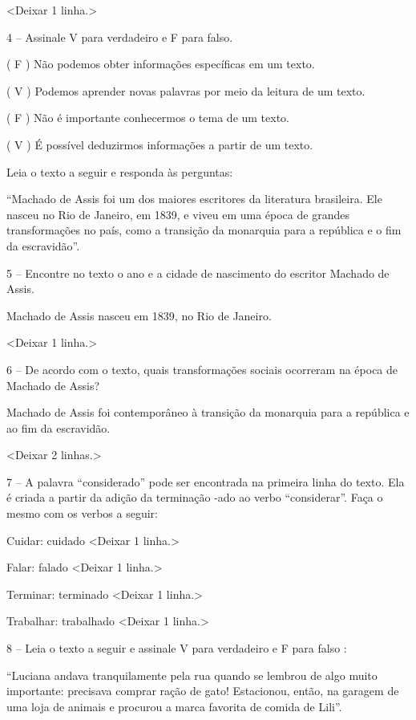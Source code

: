 \textless{}Deixar 1 linha.\textgreater{}

4 -- Assinale V para verdadeiro e F para falso.

( F ) Não podemos obter informações específicas em um texto.

( V ) Podemos aprender novas palavras por meio da leitura de um texto.

( F ) Não é importante conhecermos o tema de um texto.

( V ) É possível deduzirmos informações a partir de um texto.

Leia o texto a seguir e responda às perguntas:

``Machado de Assis foi um dos maiores escritores da literatura
brasileira. Ele nasceu no Rio de Janeiro, em 1839, e viveu em uma época
de grandes transformações no país, como a transição da monarquia para a
república e o fim da escravidão''.

5 -- Encontre no texto o ano e a cidade de nascimento do escritor
Machado de Assis.

Machado de Assis nasceu em 1839, no Rio de Janeiro.

\textless{}Deixar 1 linha.\textgreater{}

6 -- De acordo com o texto, quais transformações sociais ocorreram na
época de Machado de Assis?

Machado de Assis foi contemporâneo à transição da monarquia para a
república e ao fim da escravidão.

\textless{}Deixar 2 linhas.\textgreater{}

7 -- A palavra ``considerado'' pode ser encontrada na primeira linha do
texto. Ela é criada a partir da adição da terminação -ado ao verbo
``considerar''. Faça o mesmo com os verbos a seguir:

Cuidar: cuidado \textless{}Deixar 1 linha.\textgreater{}

Falar: falado \textless{}Deixar 1 linha.\textgreater{}

Terminar: terminado \textless{}Deixar 1 linha.\textgreater{}

Trabalhar: trabalhado \textless{}Deixar 1 linha.\textgreater{}

8 -- Leia o texto a seguir e assinale V para verdadeiro e F para falso :

``Luciana andava tranquilamente pela rua quando se lembrou de algo muito
importante: precisava comprar ração de gato! Estacionou, então, na
garagem de uma loja de animais e procurou a marca favorita de comida de
Lili''.

